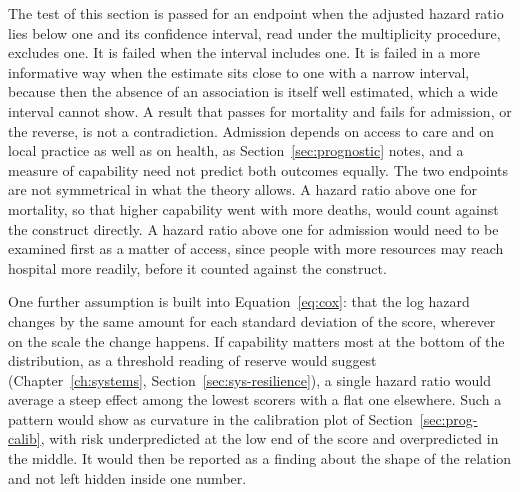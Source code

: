The test of this section is passed for an endpoint when the adjusted hazard ratio lies below one and its confidence interval, read under the multiplicity procedure, excludes one. It is failed when the interval includes one. It is failed in a more informative way when the estimate sits close to one with a narrow interval, because then the absence of an association is itself well estimated, which a wide interval cannot show. A result that passes for mortality and fails for admission, or the reverse, is not a contradiction. Admission depends on access to care and on local practice as well as on health, as Section~\ref{sec:prognostic} notes, and a measure of capability need not predict both outcomes equally. The two endpoints are not symmetrical in what the theory allows. A hazard ratio above one for mortality, so that higher capability went with more deaths, would count against the construct directly. A hazard ratio above one for admission would need to be examined first as a matter of access, since people with more resources may reach hospital more readily, before it counted against the construct.

One further assumption is built into Equation~\eqref{eq:cox}: that the log hazard changes by the same amount for each standard deviation of the score, wherever on the scale the change happens. If capability matters most at the bottom of the distribution, as a threshold reading of reserve would suggest (Chapter~\ref{ch:systems}, Section~\ref{sec:sys-resilience}), a single hazard ratio would average a steep effect among the lowest scorers with a flat one elsewhere. Such a pattern would show as curvature in the calibration plot of Section~\ref{sec:prog-calib}, with risk underpredicted at the low end of the score and overpredicted in the middle. It would then be reported as a finding about the shape of the relation and not left hidden inside one number.

